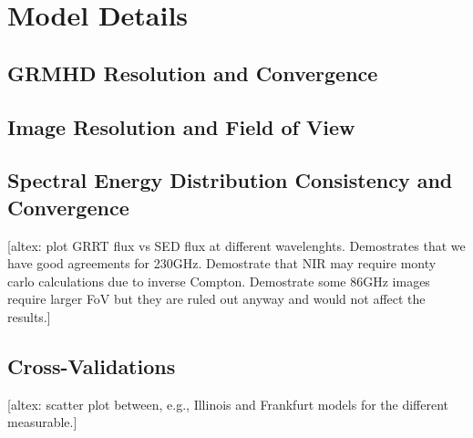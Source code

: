 \section{Model Details}\label{app:numerical}

\subsection{GRMHD Resolution and Convergence}\label{app:resolution_study}

\subsection{Image Resolution and Field of View}

\subsection{Spectral Energy Distribution Consistency and Convergence}

\begin{figure*}
    \centering
    [altex: plot GRRT flux vs SED flux at different wavelenghts.  Demostrates that we have good agreements for 230GHz.  Demostrate that NIR may require monty carlo calculations due to inverse Compton.  Demostrate some 86GHz images require larger FoV but they are ruled out anyway and would not affect the results.]
    \caption{Comparing GRRT flux from monte carlo calculations.  The three columns are 86GHz, 230GHz, and NIR, respectively.  GRRT is only used to spot check x-ray and does not have a corresponding scatter plot.}
    \label{fig:sed_vv}
\end{figure*}

\subsection{Cross-Validations}

\begin{figure*}
    \centering
    [altex: scatter plot between, e.g., Illinois and Frankfurt models for the different measurable.]
    \caption{Comparing model predictions from different modeling pipelines.  ...}
    \label{fig:xv}
\end{figure*}